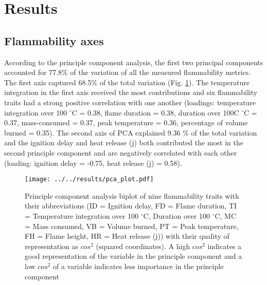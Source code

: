 \documentclass{ttuthes2007}
\begin{document}




\section{Results}

\subsection{Flammability axes}
According to the principle component analysis, the first two principal components accounted for 77.8\% of the variation of all the measured flammability metrics. The first axis %
captured 68.5\% of the total variation (Fig. \ref{fig:pca-plot}). The temperature integration in the first axis received the most contributions and six flammability traits had a strong positive correlation with one another (loadings: temperature integration over 100 $^{\circ}$C = 0.38, flame duration = 0.38, duration over 100C $^{\circ}$C = 0.37, mass-consumed = 0.37, peak temperature  = 0.36, percentage of volume burned = 0.35). The second axis of PCA explained 9.36 \% of the total variation and the ignition delay and heat release (j) both contributed the most in the second principle component and are negatively correlated with each other (loading: ignition delay = -0.75, heat release (j) = 0.58). 

\begin{figure}  %
    \centering
    \texttt{[image: ../../results/pca\_plot.pdf]}
    \caption[Principle components results]{\label{fig:pca-plot} Principle component analysis biplot of nine flammability traits with their abbreviations (ID = Ignition delay, FD = Flame duration, TI = Temperature integration over 100 $^{\circ}$C, Duration over 100 $^{\circ}$C, MC = Mass consumed, VB = Volume burned, PT = Peak temperature, FH = Flame height, HR = Heat release (j)) with their quality of representation as $cos^2$ (squared coordinates). A high $cos^2$ indicates a good representation of the variable in the principle component and a low $cos^2$ of a variable indicates less importance in the principle component}
  \end{figure}
\end{document}
